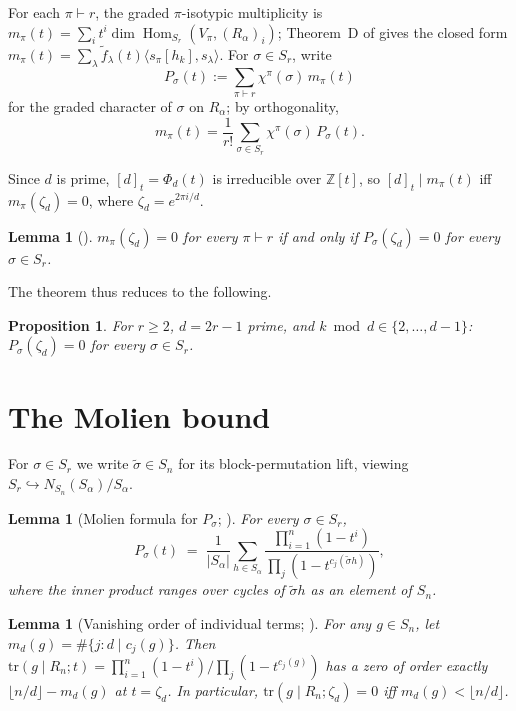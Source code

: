\documentclass[11pt]{article}
\newtheorem{proposition}[theorem]{Proposition}
\newtheorem{lemma}[theorem]{Lemma}
\theoremstyle{plain}
\theoremstyle{definition}
\theoremstyle{remark}
\newcommand{\Hom}{\operatorname{Hom}}
\newcommand{\fdeg}{\widetilde{f}}
\newcommand{\ZZ}{\mathbb{Z}}
\begin{document}
For each $\pi \vdash r$, the graded $\pi$-isotypic multiplicity is
$m_\pi(t) = \sum_i t^i \dim \Hom_{S_r}(V_\pi, (R_\alpha)_i)$;
Theorem~D of \cite{Clio-Wreath-general-r} gives the closed form
$m_\pi(t) = \sum_\lambda \fdeg_\lambda(t) \langle s_\pi[h_k], s_\lambda\rangle$.
For $\sigma \in S_r$, write
\[
P_\sigma(t) := \sum_{\pi \vdash r} \chi^\pi(\sigma) \, m_\pi(t)
\]
for the graded character of $\sigma$ on $R_\alpha$; by orthogonality,
\[
m_\pi(t) = \frac{1}{r!} \sum_{\sigma \in S_r} \chi^\pi(\sigma) \, P_\sigma(t).
\]

Since $d$ is prime, $[d]_t = \Phi_d(t)$ is irreducible over $\ZZ[t]$, so
$[d]_t \mid m_\pi(t)$ iff $m_\pi(\zeta_d) = 0$, where $\zeta_d = e^{2\pi i/d}$.

\begin{lemma}[{\cite[Lem 4.1]{Clio-first-period}}]
\label{lem:reduce}
$m_\pi(\zeta_d) = 0$ for every $\pi \vdash r$ if and only if
$P_\sigma(\zeta_d) = 0$ for every $\sigma \in S_r$.
\end{lemma}

The theorem thus reduces to the following.

\begin{proposition}
\label{prop:main}
For $r \ge 2$, $d = 2r - 1$ prime, and $k \bmod d \in \{2, \ldots, d-1\}$:
$P_\sigma(\zeta_d) = 0$ for every $\sigma \in S_r$.
\end{proposition}

\section{The Molien bound}

For $\sigma \in S_r$ we write $\tilde\sigma \in S_n$ for its
block-permutation lift, viewing
$S_r \hookrightarrow N_{S_n}(S_\alpha)/S_\alpha$.

\begin{lemma}[{Molien formula for $P_\sigma$; \cite[Lem 4.3]{Clio-first-period}}]
\label{lem:molien}
For every $\sigma \in S_r$,
\[
P_\sigma(t) \;=\;
\frac{1}{|S_\alpha|} \sum_{h \in S_\alpha}
\frac{\prod_{i=1}^{n}(1 - t^i)}{\prod_j (1 - t^{c_j(\tilde\sigma h)})},
\]
where the inner product ranges over cycles of $\tilde\sigma h$ as an
element of $S_n$.
\end{lemma}

\begin{lemma}[{Vanishing order of individual terms; \cite[Lem 4.4]{Clio-first-period}}]
\label{lem:order}
For any $g \in S_n$, let $m_d(g) = \#\{j : d \mid c_j(g)\}$. Then
$\text{tr}(g \mid R_n; t) = \prod_{i=1}^n(1-t^i)/\prod_j(1 - t^{c_j(g)})$
has a zero of order exactly $\lfloor n/d\rfloor - m_d(g)$ at $t = \zeta_d$.
In particular, $\text{tr}(g \mid R_n; \zeta_d) = 0$ iff
$m_d(g) < \lfloor n/d\rfloor$.
\end{lemma}
\end{document}
